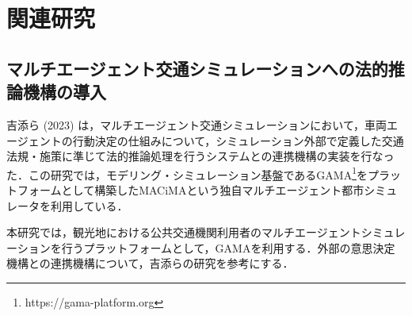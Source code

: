 \section{関連研究}
\subsection{マルチエージェント交通シミュレーションへの法的推論機構の導入}
吉添ら (2023) は，マルチエージェント交通シミュレーションにおいて，車両エージェントの行動決定の仕組みについて，シミュレーション外部で定義した交通法規・施策に準じて法的推論処理を行うシステムとの連携機構の実装を行なった\cite{yoshizoe2023}．この研究では，モデリング・シミュレーション基盤であるGAMA\footnote{https://gama-platform.org}をプラットフォームとして構築したMACiMAという独自マルチエージェント都市シミュレータを利用している．

本研究では，観光地における公共交通機関利用者のマルチエージェントシミュレーションを行うプラットフォームとして，GAMAを利用する．外部の意思決定機構との連携機構について，吉添らの研究を参考にする．
